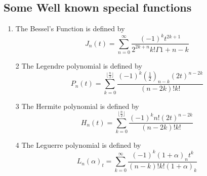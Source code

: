   \subsection{Some Well known special functions}
  \begin{enumerate}

  \item The Bessel's Function is defined by
  \begin{equation}
   J_{n}(t)= \sum_{n=0}^{\infty} \frac{(-1)^{k}t^{2k+1}}{2^{2k+n}k!\Gamma{1+n-k}}
   \end{equation}
  
   \item[2]The Legendre polynomial  is defined by
    \begin{equation}
   P_{n}(t)= \sum_{k=0}^{\lfloor\frac{n}{2}\rfloor} \frac{(-1)^{k}(\frac{1}{2})_{n-k}(2t)^{n-2k}}{(n-2k)!k!}
  \end{equation}
   
   \item[3]The Hermite polynomial  is defined by
   \begin{equation}
   H_{n}(t)= \sum_{k=0}^{\lfloor\frac{n}{2}\rfloor} \frac{(-1)^{k}n!(2t)^{n-2k}}{(n-2k)!k!}
   \end{equation}
  
   \item[4]The Leguerre polynomial is defined by
    \begin{equation}
   L_{n}(\alpha)_{t}= \sum_{k=0}^{\infty} \frac{(-1)^{k}(1+\alpha)_{n}t^{k}}{(n-k)!k!(1+\alpha)_{k}}
  \end{equation}
    \end{enumerate}
